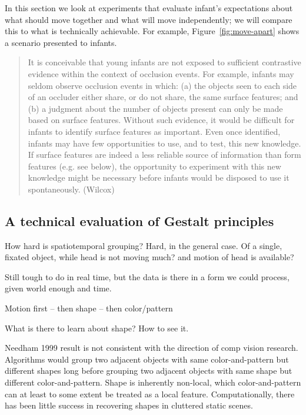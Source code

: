In this section we look at experiments that evaluate infant's
expectations about what should move together and what will move
independently; we will compare this to what is technically achievable.
For example, Figure~\ref{fig:move-apart} shows a scenario presented to
infants.



\begin{quote}

It is conceivable that young infants are not exposed to sufficient
contrastive evidence within the context of occlusion events. For
example, infants may seldom observe occlusion events in which: (a) the
objects seen to each side of an occluder either share, or do not
share, the same surface features; and (b) a judgment about the number
of objects present can only be made based on surface features. Without
such evidence, it would be difficult for infants to identify surface
features as important. Even once identified, infants may have few
opportunities to use, and to test, this new knowledge. If surface
features are indeed a less reliable source of information than form
features (e.g. see below), the opportunity to experiment with this new
knowledge might be necessary before infants would be disposed to use
it spontaneously. (Wilcox)

\end{quote}





\subsection{A technical evaluation of Gestalt principles}

How hard is spatiotemporal grouping?
Hard, in the general case.
Of a single, fixated object, while head is not moving much?  and
motion of head is available?

Still tough to do in real time, but the data is there in a form
we could process, given world enough and time.


Motion first -- then shape -- then color/pattern

What is there to learn about shape?  How to see it.

Needham 1999 result is not consistent with the direction of comp
vision research.  Algorithms would group two adjacent objects with
same color-and-pattern but different shapes long before grouping two
adjacent objects with same shape but different color-and-pattern.
Shape is inherently non-local, which color-and-pattern 
can at least to some extent be treated as a local feature.
Computationally, there 
has been little success in recovering shapes in cluttered static scenes.

